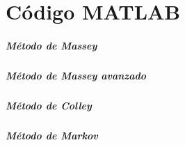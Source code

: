 \chapter{Código MATLAB}

\paragraph{Método de Massey}



\paragraph{Método de Massey avanzado}

\paragraph{Método de Colley}

\paragraph{Método de Markov}
